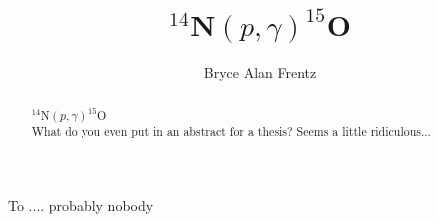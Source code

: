 \documentclass[draft,numrefs,sort&compress]{nddiss2e}
\begin{document}
\frontmatter %

\title{$^{14}$N$\left( p,\gamma \right) ^{15}$O}
\author{Bryce Alan Frentz}

\maketitle
%
%

\makecopyright

\begin{abstract}
  
  $^{14}$N$\left( p,\gamma \right) ^{15}$O \\
  
  What do you even put in an abstract for a thesis? Seems a little ridiculous...
  
\end{abstract}

\renewcommand{\dedicationname}{NEW DEDICATION NAME}

\begin{dedication}
  To .... probably nobody
\end{dedication}

\tableofcontents
\listoffigures
\listoftables
\end{document}
